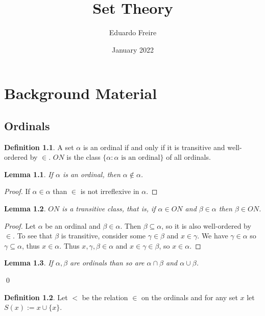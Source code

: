 \documentclass{report}
\title{Set Theory}
\author{Eduardo Freire}
\date{January 2022}
\newtheorem{lemma}{Lemma}[section]
\theoremstyle{definition}
\newtheorem{definition}{Definition}[section]
\theoremstyle{remark}
\newcommand{\set}[1]{\{#1\}}
\begin{document}
\maketitle
\tableofcontents

\chapter{Background Material}
\section{Ordinals}

\begin{definition}
    A set $\alpha$ is an ordinal if and only if it is transitive and well-ordered by $\in$. $ON$ is the class $\set{\alpha : \alpha \text{ is an ordinal}}$ of all ordinals.
\end{definition}

\begin{lemma}
    If $\alpha$ is an ordinal, then $\alpha \notin \alpha$.
\end{lemma}

\begin{proof}
    If $\alpha \in \alpha$ than $\in$ is not irreflexive in $\alpha$.
\end{proof}

\begin{lemma}
    $ON$ is a transitive class, that is, if $\alpha \in ON$ and $\beta \in \alpha$ then $\beta \in ON$.
\end{lemma}

\begin{proof}
    Let $\alpha$ be an ordinal and $\beta \in \alpha$. Then $\beta \subseteq \alpha$, so it is also well-ordered by $\in$. To see that $\beta$ is transitive, consider some $\gamma \in \beta$ and $x \in \gamma$. We have $\gamma \in \alpha$ so $\gamma \subseteq \alpha$, thus $x \in \alpha$. Thus $x, \gamma, \beta \in \alpha$ and $x \in \gamma \in \beta$, so $x \in \alpha$.
\end{proof}

\begin{lemma}
    If $\alpha, \beta$ are ordinals than so are $\alpha \cap \beta$ and $\alpha \cup \beta$.
\end{lemma} \qed

\begin{definition}
    Let $<$ be the relation $\in$ on the ordinals and for any set $x$ let $S(x) := x \cup \set{x}$.
\end{definition}
\end{document}
